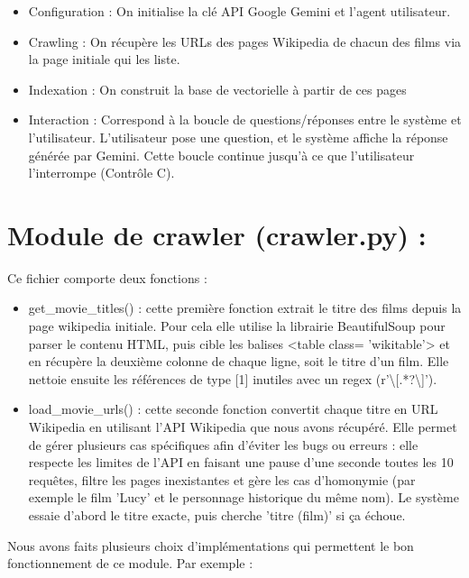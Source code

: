 \documentclass[11pt]{report}
\begin{document}
    \begin{itemize}
        \item Configuration : On initialise la clé API Google Gemini et l'agent utilisateur.
        \item Crawling : On récupère les URLs des pages Wikipedia de chacun des films via la page
        initiale qui les liste.
        \item Indexation : On construit la base de vectorielle à partir de ces pages
        \item Interaction : Correspond à la boucle de questions/réponses entre le système et l'utilisateur.
        L'utilisateur pose une question, et le système affiche la réponse générée par Gemini. Cette
        boucle continue jusqu'à ce que l'utilisateur l'interrompe (Contrôle C).
    \end{itemize}
 
    \section{Module de crawler (crawler.py) :}
 
    Ce fichier comporte deux fonctions :
 
    \begin{itemize}
        \item get\_movie\_titles() : cette première fonction extrait le titre des films depuis la page wikipedia
        initiale. Pour cela elle utilise la librairie BeautifulSoup pour parser le contenu HTML, puis
        cible les balises <table class= 'wikitable'> et en récupère la deuxième colonne de chaque
        ligne, soit le titre d'un film. Elle nettoie ensuite les références de type [1] inutiles avec un
        regex (r'\textbackslash[.*?\textbackslash]').
        \item load\_movie\_urls() : cette seconde fonction convertit chaque titre en URL Wikipedia en
        utilisant l'API Wikipedia que nous avons récupéré. Elle permet de gérer plusieurs cas
        spécifiques afin d'éviter les bugs ou erreurs : elle respecte les limites de l'API en faisant une
        pause d'une seconde toutes les 10 requêtes, filtre les pages inexistantes et gère les cas
        d'homonymie (par exemple le film 'Lucy' et le personnage historique du même nom). Le
        système essaie d'abord le titre exacte, puis cherche 'titre (film)' si ça échoue.
    \end{itemize}
 
    Nous avons faits plusieurs choix d'implémentations qui permettent le bon fonctionnement de ce
    module. Par exemple :
 
\end{document}
